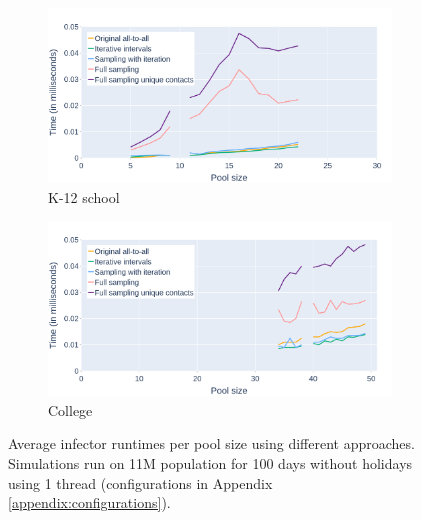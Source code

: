 \begin{figure}\ContinuedFloat
    \centering
    \begin{subfigure}{.8\linewidth}
        \centering
        \includegraphics[width=\textwidth]{4 - Sampling/fig/full_sampling_unique_contacts/times_avg_fsuc_k12school.png}
        \caption{K-12 school}
        \label{fig:times_avg_fsuc_k12school}
    \end{subfigure}
    \begin{subfigure}{.8\linewidth}
        \centering
        \includegraphics[width=\textwidth]{4 - Sampling/fig/full_sampling_unique_contacts/times_avg_fsuc_college.png}
        \caption{College}
        \label{fig:times_avg_fsuc_college}
    \end{subfigure}
    \caption{Average infector runtimes per pool size using different approaches. Simulations run on 11M population for 100 days without holidays using 1 thread (configurations in Appendix \ref{appendix:configurations}).}
    \label{fig:times_avg_fsuc}
\end{figure}

